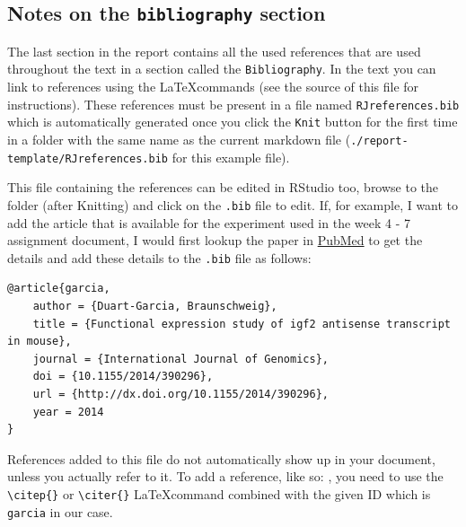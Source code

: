 \hypertarget{notes-on-the-bibliography-section}{%
\subsection{\texorpdfstring{Notes on the \texttt{bibliography}
section}{Notes on the bibliography section}}\label{notes-on-the-bibliography-section}}

The last section in the report contains all the used references that are
used throughout the text in a section called the \texttt{Bibliography}.
In the text you can link to references using the \LaTeX commands (see
the source of this file for instructions). These references must be
present in a file named \texttt{RJreferences.bib} which is automatically
generated once you click the \texttt{Knit} button for the first time in
a folder with the same name as the current markdown file
(\texttt{./report-template/RJreferences.bib} for this example file).

This file containing the references can be edited in RStudio too, browse
to the folder (after Knitting) and click on the \texttt{.bib} file to
edit. If, for example, I want to add the article that is available for
the experiment used in the week 4 - 7 assignment document, I would first
lookup the paper in
\href{http://www.ncbi.nlm.nih.gov/pmc/articles/PMC3914337/}{PubMed} to
get the details and add these details to the \texttt{.bib} file as
follows:

\begin{verbatim}
@article{garcia,
    author = {Duart-Garcia, Braunschweig},
    title = {Functional expression study of igf2 antisense transcript in mouse},
    journal = {International Journal of Genomics},
    doi = {10.1155/2014/390296},
    url = {http://dx.doi.org/10.1155/2014/390296},
    year = 2014
}
\end{verbatim}

References added to this file do not automatically show up in your
document, unless you actually refer to it. To add a reference, like so:
\citep{garcia:2014}, you need to use the
\texttt{\textbackslash{}citep\{\}} or \texttt{\textbackslash{}citer\{\}}
\LaTeX command combined with the given ID which is \texttt{garcia} in
our case.




\address{%
Diemer Harbers\\
Hanze University of Applied Sciences\\%
Zernikeplein 11\\
%
%
%
\\\ldots{}\citet{st.hanze.nl}
}

\address{%
Douwe Metselaar\\
Hanze University of Applied Sciences\\%
Zernikeplein 11\\
%
%
%
\\\href{mailto:d.g.metselaar@st.hanze.nl}{\nolinkurl{d.g.metselaar@st.hanze.nl}}
}
